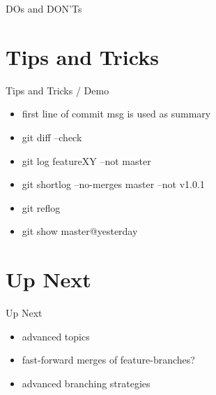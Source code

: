 \documentclass{beamer}
\begin{document}
\begin{frame}{DOs and DON'Ts}
\end{frame}


\section{Tips and Tricks}

\begin{frame}{Tips and Tricks / Demo}
  \begin{itemize}
    \item
      first line of commit msg is used as summary
    \item
      git diff --check
    \item
      git log featureXY --not master
    \item
      git shortlog --no-merges master --not v1.0.1
    \item
      git reflog
    \item
      git show master@{yesterday}
  \end{itemize}
\end{frame}


\section{Up Next}

\begin{frame}{Up Next}
  \begin{itemize}
    \item
      advanced topics
    \item
      fast-forward merges of feature-branches?
    \item
      advanced branching strategies
  \end{itemize}
\end{frame}
\end{document}
